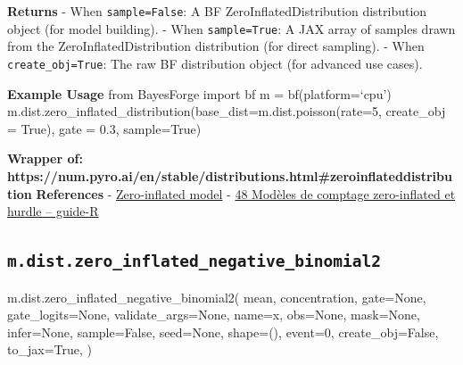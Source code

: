 \documentclass[
  letterpaper,
  DIV=11,
  numbers=noendperiod]{scrartcl}
\newenvironment{Shaded}{\begin{snugshade}}{\end{snugshade}}
\newcommand{\DecValTok}[1]{\textcolor[rgb]{0.68,0.00,0.00}{#1}}
\newcommand{\NormalTok}[1]{\textcolor[rgb]{0.00,0.23,0.31}{#1}}
\newcommand{\OperatorTok}[1]{\textcolor[rgb]{0.37,0.37,0.37}{#1}}
\newcommand{\StringTok}[1]{\textcolor[rgb]{0.13,0.47,0.30}{#1}}
\newcommand{\VariableTok}[1]{\textcolor[rgb]{0.07,0.07,0.07}{#1}}
\begin{document}
\textbf{Returns} - When \texttt{sample=False}: A BF
ZeroInflatedDistribution distribution object (for model building). -
When \texttt{sample=True}: A JAX array of samples drawn from the
ZeroInflatedDistribution distribution (for direct sampling). - When
\texttt{create\_obj=True}: The raw BF distribution object (for advanced
use cases).

\textbf{Example Usage} from BayesForge import bf m = bf(platform=`cpu')
m.dist.zero\_inflated\_distribution(base\_dist=m.dist.poisson(rate=5,
create\_obj = True), gate = 0.3, sample=True)

\textbf{Wrapper of:
https://num.pyro.ai/en/stable/distributions.html\#zeroinflateddistribution}
\textbf{References} -
\href{https://en.wikipedia.org/wiki/Zero-inflated_model}{Zero-inflated
model} -
\href{https://larmarange.github.io/guide-R/analyses_avancees/modeles-zero-inflated.html}{48
Modèles de comptage zero-inflated et hurdle -- guide-R}

\subsection{\texorpdfstring{\texttt{m.dist.zero\_inflated\_negative\_binomial2}}{m.dist.zero\_inflated\_negative\_binomial2}}\label{zero_inflated_negative_binomial2}

\begin{Shaded}
\begin{Highlighting}[]
\NormalTok{m.dist.zero\_inflated\_negative\_binomial2(}
\NormalTok{    mean,}
\NormalTok{    concentration,}
\NormalTok{    gate}\OperatorTok{=}\VariableTok{None}\NormalTok{,}
\NormalTok{    gate\_logits}\OperatorTok{=}\VariableTok{None}\NormalTok{,}
\NormalTok{    validate\_args}\OperatorTok{=}\VariableTok{None}\NormalTok{,}
\NormalTok{    name}\OperatorTok{=}\StringTok{\textquotesingle{}x\textquotesingle{}}\NormalTok{,}
\NormalTok{    obs}\OperatorTok{=}\VariableTok{None}\NormalTok{,}
\NormalTok{    mask}\OperatorTok{=}\VariableTok{None}\NormalTok{,}
\NormalTok{    infer}\OperatorTok{=}\VariableTok{None}\NormalTok{,}
\NormalTok{    sample}\OperatorTok{=}\VariableTok{False}\NormalTok{,}
\NormalTok{    seed}\OperatorTok{=}\VariableTok{None}\NormalTok{,}
\NormalTok{    shape}\OperatorTok{=}\NormalTok{(),}
\NormalTok{    event}\OperatorTok{=}\DecValTok{0}\NormalTok{,}
\NormalTok{    create\_obj}\OperatorTok{=}\VariableTok{False}\NormalTok{,}
\NormalTok{    to\_jax}\OperatorTok{=}\VariableTok{True}\NormalTok{,}
\NormalTok{)}
\end{Highlighting}
\end{Shaded}
\end{document}
